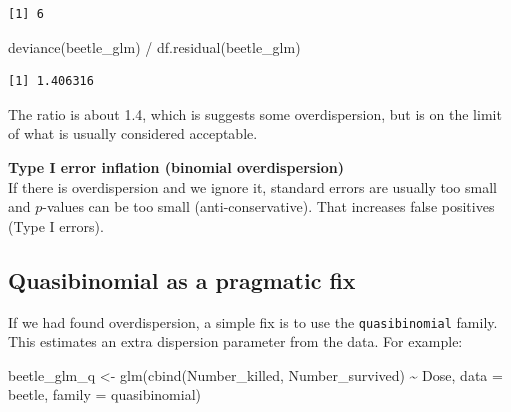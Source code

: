\documentclass[
  letterpaper,
  8pt,
  a4paper]{book}
\newenvironment{Shaded}{\begin{snugshade}}{\end{snugshade}}
\newcommand{\AttributeTok}[1]{\textcolor[rgb]{0.40,0.45,0.13}{#1}}
\newcommand{\FunctionTok}[1]{\textcolor[rgb]{0.28,0.35,0.67}{#1}}
\newcommand{\NormalTok}[1]{\textcolor[rgb]{0.00,0.23,0.31}{#1}}
\newcommand{\OtherTok}[1]{\textcolor[rgb]{0.00,0.23,0.31}{#1}}
\newcommand{\SpecialCharTok}[1]{\textcolor[rgb]{0.37,0.37,0.37}{#1}}
\begin{document}
\begin{verbatim}
[1] 6
\end{verbatim}

\begin{Shaded}
\begin{Highlighting}[]
\FunctionTok{deviance}\NormalTok{(beetle\_glm) }\SpecialCharTok{/} \FunctionTok{df.residual}\NormalTok{(beetle\_glm)}
\end{Highlighting}
\end{Shaded}

\begin{verbatim}
[1] 1.406316
\end{verbatim}

The ratio is about 1.4, which is suggests some overdispersion, but is on
the limit of what is usually considered acceptable.

\begin{tcolorbox}[enhanced jigsaw, arc=.35mm, bottomrule=.15mm, bottomtitle=1mm, breakable, colback=white, colbacktitle=quarto-callout-caution-color!10!white, colframe=quarto-callout-caution-color-frame, coltitle=black, left=2mm, leftrule=.75mm, opacityback=0, opacitybacktitle=0.6, rightrule=.15mm, title=\textcolor{quarto-callout-caution-color}{\faFire}\hspace{0.5em}{Caution}, titlerule=0mm, toprule=.15mm, toptitle=1mm]

\textbf{Type I error inflation (binomial overdispersion)}\\
If there is overdispersion and we ignore it, standard errors are usually
too small and \(p\)-values can be too small (anti-conservative). That
increases false positives (Type I errors).

\end{tcolorbox}

\subsection*{Quasibinomial as a pragmatic
fix}\label{quasibinomial-as-a-pragmatic-fix}

If we had found overdispersion, a simple fix is to use the
\texttt{quasibinomial} family. This estimates an extra dispersion
parameter from the data. For example:

\begin{Shaded}
\begin{Highlighting}[]
\NormalTok{beetle\_glm\_q }\OtherTok{\textless{}{-}} \FunctionTok{glm}\NormalTok{(}\FunctionTok{cbind}\NormalTok{(Number\_killed, Number\_survived) }\SpecialCharTok{\textasciitilde{}}\NormalTok{ Dose,}
                    \AttributeTok{data =}\NormalTok{ beetle, }\AttributeTok{family =}\NormalTok{ quasibinomial)}
\end{Highlighting}
\end{Shaded}
\end{document}
